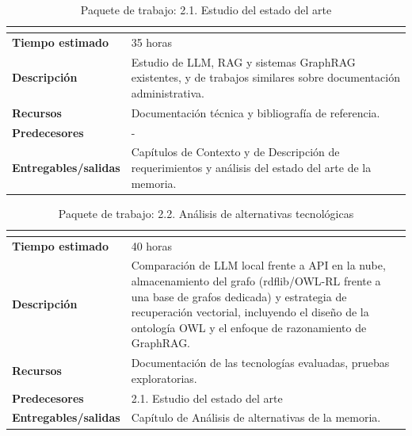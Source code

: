 \documentclass[11pt, a4paper]{report}
\begin{document}
	\begin{table}[H]
		\centering
		\begin{tabularx}{\linewidth}{|>{\bfseries}l|X|}
			\hline
			\rowcolor{pkg-investigacion}
			\multicolumn{2}{|c|}{\textcolor{white}{\textbf{2.1. Estudio del estado del arte}}} \\
			\hline
			Tiempo estimado & 35 horas \\
			\hline
			\rowcolor{fila-alterna}
			Descripción & Estudio de LLM, RAG y sistemas GraphRAG existentes, y de
			trabajos similares sobre documentación administrativa. \\
			\hline
			Recursos & Documentación técnica y bibliografía de referencia. \\
			\hline
			\rowcolor{fila-alterna}
			Predecesores & - \\
			\hline
			Entregables/salidas & Capítulos de Contexto y de Descripción de
			requerimientos y análisis del estado del arte de la memoria. \\
			\hline
		\end{tabularx}
		\caption{Paquete de trabajo: 2.1. Estudio del estado del arte}
		\label{tab:pkg-estado-arte}
	\end{table}

	\begin{table}[H]
		\centering
		\begin{tabularx}{\linewidth}{|>{\bfseries}l|X|}
			\hline
			\rowcolor{pkg-investigacion}
			\multicolumn{2}{|c|}{\textcolor{white}{\textbf{2.2. Análisis de alternativas tecnológicas}}} \\
			\hline
			Tiempo estimado & 40 horas \\
			\hline
			\rowcolor{fila-alterna}
			Descripción & Comparación de LLM local frente a API en la nube,
			almacenamiento del grafo (rdflib/OWL-RL frente a una base de grafos
			dedicada) y estrategia de recuperación vectorial, incluyendo el diseño
			de la ontología OWL y el enfoque de razonamiento de GraphRAG. \\
			\hline
			Recursos & Documentación de las tecnologías evaluadas, pruebas
			exploratorias. \\
			\hline
			\rowcolor{fila-alterna}
			Predecesores & 2.1. Estudio del estado del arte \\
			\hline
			Entregables/salidas & Capítulo de Análisis de alternativas de la
			memoria. \\
			\hline
		\end{tabularx}
		\caption{Paquete de trabajo: 2.2. Análisis de alternativas tecnológicas}
		\label{tab:pkg-alternativas}
	\end{table}
\end{document}
